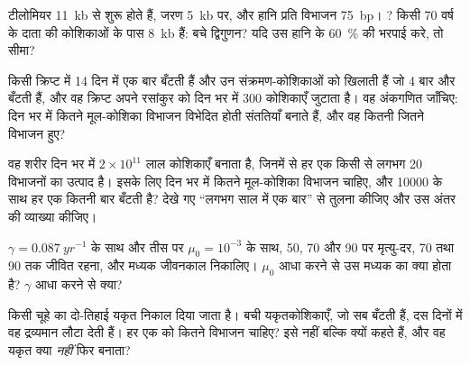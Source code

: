 \begin{exercise}[$\star\star$]\label{exo:b3:stem-cells:5}
टीलोमियर \qty{11}{kb} से शुरू होते हैं, जरण \qty{5}{kb} पर, और हानि
प्रति विभाजन \qty{75}{bp}। ? किसी 70 वर्ष के दाता की
कोशिकाओं के पास \qty{8}{kb} हैं: बचे द्विगुणन? यदि  उस हानि
के \qty{60}{\%} की भरपाई करे, तो सीमा?
\end{exercise}

\begin{exercise}[$\star\star$]\label{exo:b3:stem-cells:6}
किसी क्रिप्ट में 14  दिन में एक बार बँटती हैं और उन
संक्रमण-कोशिकाओं को खिलाती हैं जो 4 बार और बँटती हैं, और वह क्रिप्ट
अपने रसांकुर को दिन भर में \num{300} कोशिकाएँ जुटाता है। वह अंकगणित
जाँचिए: दिन भर में कितने मूल-कोशिका विभाजन विभेदित होती संततियाँ बनाते
हैं, और वह कितनी  जितने विभाजन हुए?
\end{exercise}

\begin{exercise}[$\star\star$]\label{exo:b3:stem-cells:7}
वह शरीर दिन भर में $2\times 10^{11}$ लाल कोशिकाएँ बनाता है, जिनमें से
हर एक किसी  से लगभग 20 विभाजनों का उत्पाद है। इसके लिए दिन
भर में कितने मूल-कोशिका विभाजन चाहिए, और \num{10000}  के
साथ हर एक कितनी बार बँटती है? देखे गए ``लगभग साल में एक बार'' से तुलना
कीजिए और उस अंतर की व्याख्या कीजिए।
\end{exercise}

\begin{exercise}[$\star\star$]\label{exo:b3:stem-cells:8}
$\gamma = \qty{0.087}{yr^{-1}}$ के साथ और तीस पर $\mu_{0} = 10^{-3}$ के
साथ, 50, 70 और 90 पर मृत्यु-दर, 70 तथा 90 तक जीवित रहना, और मध्यक
जीवनकाल निकालिए। $\mu_{0}$ आधा करने से उस मध्यक का क्या होता है?
$\gamma$ आधा करने से क्या?
\end{exercise}

\begin{exercise}[$\star\star$]\label{exo:b3:stem-cells:9}
किसी चूहे का दो-तिहाई यकृत निकाल दिया जाता है। बची यकृतकोशिकाएँ, जो सब
बँटती हैं, दस दिनों में वह द्रव्यमान लौटा देती हैं। हर एक को कितने
विभाजन चाहिए? इसे  नहीं बल्कि  क्यों कहते हैं,
और वह यकृत क्या \emph{नहीं} फिर बनाता?
\end{exercise}

